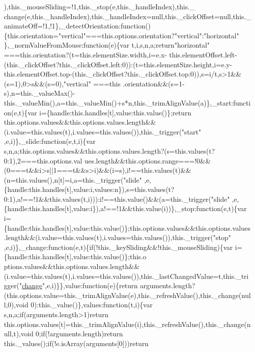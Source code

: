 \begin{DoxyCode}
{      ),this.\_mouseSliding=!1,this.\_stop(e,this.\_handleIndex),this.\_
      change(e,this.\_handleIndex),this.\_handleIndex=null,this.\_clickOffset=null,this.\_animateOff=!1,!1\},\_detectOrientation:function()\{this.orientation="}vertical\textcolor{stringliteral}{"===this.options.orientation?"}vertical\textcolor{stringliteral}{":"}horizontal\textcolor{stringliteral}{"
      \},\_normValueFromMouse:function(e)\{var t,i,s,n,a;return"}horizontal\textcolor{stringliteral}{"
      ===this.orientation?(t=this.elementSize.width,i=e.x-
      this.elementOffset.left-(this.\_clickOffset?this.\_clickOffset.left:0)):(t=this.elementSize.height,i=e.y-this.elementOffset.top-(this.\_clickOffset?this.\_clickOffset.top:0)),s=i/t,s>1&&(s=1),0>s&&(s=0),"}vertical\textcolor{stringliteral}{"
      ===this
      .orientation&&(s=1-s),n=this.\_valueMax()-this.\_valueMin(),a=this.\_valueMin()+s*n,this.\_trimAlignValue(a)\},\_start:function(e,t)\{var i=\{handle:this.handles[t],value:this.value()\};return
       this.options.values&&this.options.values.length&&(i.value=this.values(t),i.values=this.values()),this.\_trigger("}start\textcolor{stringliteral}{"
      ,e,i)\},\_slide:function(e,t,i)\{var
       s,n,a;this.options.values&&this.options.values.length?(s=this.values(t?0:1),2===this.options.val
      ues.length&&this.options.range===!0&&(0===t&&i>s||1===t&&s>i)&&(i=s),i!==this.values(t)&&(n=this.values(),n[t]=i,a=this.\_trigger("}slide\textcolor{stringliteral}{"
      ,e,\{handle:this.handles[t],value:i,values:n\}),s=this.values(t?0:1),a!==!1&&this.values(t,i))):i!==this.value()&&(a=this.\_trigger("}slide\textcolor{stringliteral}{"
      ,e,\{handle:this.handles[t],value:i\}),a!==!1&&this.value(i))\},\_stop:function(e,t)\{var
       i=\{handle:this.handles[t],value:this.value()\};this.options.values&&this.options.values.length&&(i.value=this.values(t),i.values=this.values()),this.\_trigger("}stop\textcolor{stringliteral}{"
      ,e,i)\},\_change:function(e,t)\{if(!this.\_keySliding&&!this.\_mouseSliding)\{var
       i=\{handle:this.handles[t],value:this.value()\};this.o
      ptions.values&&this.options.values.length&&(i.value=this.values(t),i.values=this.values()),this.\_lastChangedValue=t,this.\_trigger("}\hyperlink{populate_update_8js_afe74bb0e6ea5cd0ef12cd5f98d359f37}{change}\textcolor{stringliteral}{",e,i)\}\},value:function(e)\{return
       arguments.length?(this.options.value=this.\_trimAlignValue(e),this.\_refreshValue(),this.\_change(null,0),void
       0):this.\_value()\},values:function(t,i)\{var s,n,a;if(arguments.length>1)return
       this.options.values[t]=this.\_trimAlignValue(i),this.\_refreshValue(),this.\_change(null,t),void 0;if(!arguments.length)return this.\_values();if(!e.isArray(arguments[0]))return
}
\end{DoxyCode}
